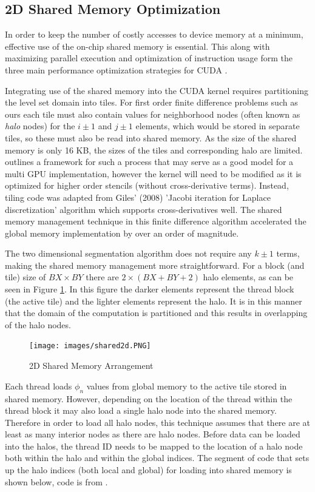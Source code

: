 	\subsection{2D Shared Memory Optimization}
In order to keep the number of costly accesses to device memory at a minimum, effective use of the on-chip shared memory is essential. This along with maximizing parallel execution and optimization of instruction usage form the three main performance optimization strategies for CUDA \cite{cuda}.

Integrating use of the shared memory into the CUDA kernel requires partitioning the level set domain into tiles. For first order finite difference problems such as ours each tile must also contain values for neighborhood nodes (often known as \textit{halo} nodes) for the $i\pm1$ and $j\pm1$ elements, which would be stored in separate tiles, so these must also be read into shared memory. As the size of the shared memory is only 16 KB, the sizes of the tiles and corresponding halo are limited. \cite{3dfinitedifference} outlines a framework for such a process that may serve as a good model for a multi GPU implementation, however the kernel will need to be modified as it is optimized for higher order stencils (without cross-derivative terms). Instead, tiling code was adapted from Giles' (2008) 'Jacobi iteration for Laplace discretization' algorithm \cite{mgiles} which supports cross-derivatives well. The shared memory management technique in this finite difference algorithm accelerated the global memory implementation by over an order of magnitude.

The two dimensional segmentation algorithm does not require any $k\pm1$ terms, making the shared memory management more straightforward. For a block (and tile) size of $BX\times BY$ there are $2 \times (BX + BY +2)$ halo elements, as can be seen in Figure \ref{fig:shared2d}. In this figure the darker elements represent the thread block (the active tile) and the lighter elements represent the halo. It is in this manner that the domain of the computation is partitioned and this results in overlapping of the halo nodes.

\begin{figure}[h]
	\centering
		\texttt{[image: images/shared2d.PNG]}
	\caption{2D Shared Memory Arrangement}
	\label{fig:shared2d}
\end{figure}

Each thread loads  $\phi_n$ values from global memory to the active tile stored in shared memory. However, depending on the location of the thread within the thread block it may also load a single halo node into the shared memory. Therefore in order to load all halo nodes, this technique assumes that there are at least as many interior nodes as there are halo nodes. Before data can be loaded into the halos, the thread ID needs to be mapped to the location of a halo node both within the halo and within the global indices. The segment of code that sets up the halo indices (both local and global) for loading into shared memory is shown below, code is from \cite{mgiles}.

